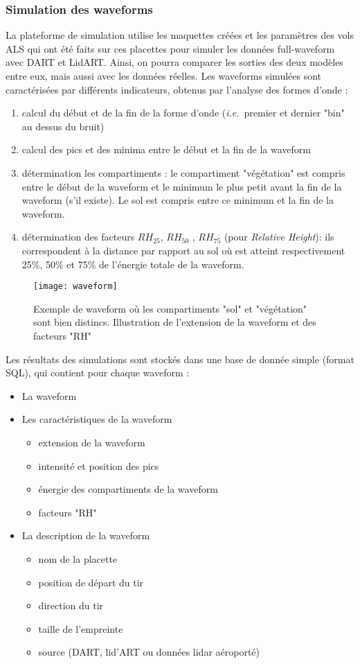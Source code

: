 \documentclass[a4paper,11pt]{article}
\newcommand{\ie}{\textit{i.e.}~}
\begin{document}
\subsubsection{Simulation des waveforms}
La plateforme de simulation utilise les maquettes créées et les paramètres des vols ALS qui ont été faits sur ces placettes pour simuler les données full-waveform avec DART et LidART.  Ainsi, on pourra comparer les sorties des deux modèles entre eux, mais aussi avec les données réelles. Les waveforms simulées sont caractérisées par différents indicateurs, obtenus par l'analyse des formes d'onde :
\begin{enumerate}
\item calcul du début et de la fin de la forme d'onde (\ie premier et dernier "bin" au dessus du bruit)
\item calcul des pics et des minima entre le début et la fin de la waveform
\item détermination les compartiments : le compartiment "végétation" est compris entre le début de la waveform et le minimum le plus petit avant la fin de la waveform (s'il existe). Le sol est compris entre ce minimum et la fin de la waveform. 
\item détermination des facteurs $RH_{25}$, $RH_{50}$ , $RH_{75}$ (pour \textit{Relative Height}): ils correspondent à la distance par rapport au sol où est atteint  respectivement 25\%, 50\% et 75\% de l'énergie totale de la waveform.
\end{enumerate}


\begin{figure}[!htpb]
\centering
\texttt{[image: waveform]}
\caption{Exemple de waveform  où les compartiments "sol" et "végétation" sont bien distincs. Illustration de l'extension de la waveform et des facteurs "RH"}
\label{fig:voxels}
\end{figure}
Les résultats des simulations sont stockés dans une base de donnée simple (format SQL), qui contient pour chaque waveform :


\begin{itemize}
\item[\textbullet] La waveform
\item[\textbullet] Les caractéristiques de la waveform
\begin{itemize}
\item extension de la waveform
\item intensité et position des pics
\item énergie des compartiments de la waveform 
\item facteurs "RH"
\end{itemize} 
\item[\textbullet] La description de la waveform
\begin{itemize}
\item nom de la placette
\item position de départ du tir
\item direction du tir
\item taille de l'empreinte
\item source (DART, lid'ART ou données lidar aéroporté)
\end{itemize}
\end{itemize}
\end{document}
